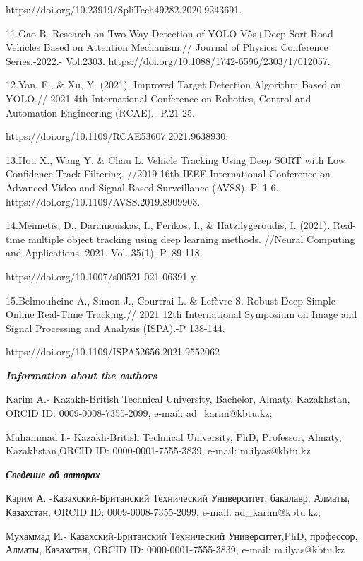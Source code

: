 \begin{noparindent}
https://doi.org/10.23919/SpliTech49282.2020.9243691.

11.Gao B. Research on Two-Way Detection of YOLO V5s+Deep Sort Road
Vehicles Based on Attention Mechanism.// Journal of Physics: Conference
Series.-2022.- Vol.2303.
https://doi.org/10.1088/1742-6596/2303/1/012057.

12.Yan, F., \& Xu, Y. (2021). Improved Target Detection Algorithm Based
on YOLO.// 2021 4th International Conference on Robotics, Control and
Automation Engineering (RCAE).- P.21-25.

https://doi.org/10.1109/RCAE53607.2021.9638930.

13.Hou X., Wang Y. \& Chau L. Vehicle Tracking Using Deep SORT with Low
Confidence Track Filtering. //2019 16th IEEE International Conference on
Advanced Video and Signal Based Surveillance (AVSS).-P. 1-6.
https://doi.org/10.1109/AVSS.2019.8909903.

14.Meimetis, D., Daramouskas, I., Perikos, I., \& Hatzilygeroudis, I.
(2021). Real-time multiple object tracking using deep learning methods.
//Neural Computing and Applications.-2021.-Vol. 35(1).-P. 89-118.

https://doi.org/10.1007/s00521-021-06391-y.

15.Belmouhcine A., Simon J., Courtrai L. \& Lefèvre S. Robust Deep
Simple Online Real-Time Tracking.// 2021 12th International Symposium on
Image and Signal Processing and Analysis (ISPA).-P 138-144.

https://doi.org/10.1109/ISPA52656.2021.9552062
\end{noparindent}

\emph{{\bfseries Information about the authors}}

\begin{noparindent}
Karim A.- Kazakh-British Technical University, Bachelor, Almaty,
Kazakhstan, ORCID ID: 0009-0008-7355-2099, e-mail: ad\_karim@kbtu.kz;

Muhammad I.- Kazakh-British Technical University, PhD, Professor,
Almaty, Kazakhstan,ORCID ID: 0000-0001-7555-3839, e-mail:
m.ilyas@kbtu.kz
\end{noparindent}

\emph{{\bfseries Сведение об авторах}}

\begin{noparindent}
Карим А. -Казахский-Британский Технический Университет, бакалавр,
Алматы, Казахстан, ORCID ID: 0009-0008-7355-2099, e-mail:
ad\_karim@kbtu.kz;

Мухаммад И.- Казахский-Британский Технический Университет,PhD,
профессор, Алматы, Казахстан, ORCID ID: 0000-0001-7555-3839, e-mail:
m.ilyas@kbtu.kz
\end{noparindent}
